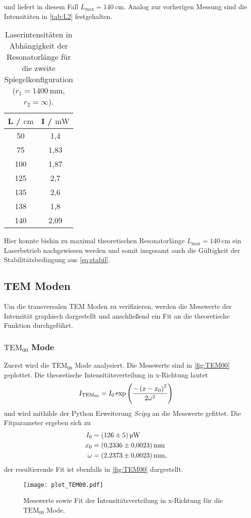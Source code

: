 und liefert in diesem Fall $L_\text{max} = \qty{140}{\centi\metre}$.
Analog zur vorherigen Messung sind die Intensitäten in \autoref{tab:L2} festgehalten.
\begin{table}[H]
  \centering
  \begin{tabular}{c|c}
    {L / $\unit{\centi\metre}$} & {I / $\unit{\milli\watt}$} \\
    \hline
    50  & 1,4  \\
    75  & 1,83  \\
    100  & 1,87  \\
    125  & 2,7  \\
    135  & 2,6  \\
    138  & 1,8  \\
    140  & 2,09  \\
  \end{tabular}
  \caption{Laserintensitäten in Abhängigkeit der Resonatorlänge für die zweite Spiegelkonfiguration ($r_1=\qty{1400}{\milli\metre}$, $r_2 = \infty$).}
  \label{tab:L2}
\end{table}
Hier konnte bishin zu maximal theoretischen Resonatorlänge $L_\text{max} = \qty{140}{\centi\metre}$ ein Laserbetrieb nachgewiesen werden und
somit insgesamt auch die Gültigkeit der Stabilitätsbedingung aus \eqref{eq:stabil}.

\subsection{TEM Moden}
Um die transversalen TEM Moden zu verifizieren, werden die Messwerte der Intensität graphisch dargestellt und anschließend ein Fit an die theoretische
Funktion durchgeführt.
\subsubsection{$\text{TEM}_{00}$ Mode}
Zuerst wird die $\text{TEM}_{00}$ Mode analysiert. Die Messwerte sind in \autoref{fig:TEM00} geplottet.
Die theoretische Intensitätsverteilung in x-Richtung lautet
\begin{equation}
  \notag
  I_{\text{TEM}_{00}} = I_0 \exp \left( \frac{-\left(x - x_0\right)^2}{2\omega^2} \right)
\end{equation}
und wird mithilde der Python Erweiterung \textit{Scipy} \cite{scipy} an die Messwerte gefittet.
Die Fitparameter ergeben sich zu
\begin{align*}
  I_0 &=\qty{126+-5}{\micro\watt} \\
  x_0 &=\qty{0.2336+-0.0023}{\milli\metre}   \\
 \omega &=\qty{2.2373+-0.0023}{\milli\metre},
\end{align*}
der resultierende Fit ist ebenfalls in \autoref{fig:TEM00} dargestellt.
\begin{figure}[H]
  \centering
  \texttt{[image: plot\_TEM00.pdf]}
  \caption{Messwerte sowie Fit der Intensitätsverteilung in x-Richtung für die $\text{TEM}_{00}$ Mode.}
  \label{fig:TEM00}
\end{figure}
